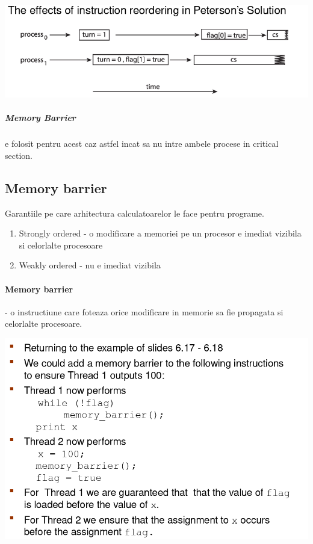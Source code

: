 \documentclass{article}
\begin{document}
\begin{center}
    \includegraphics[scale=0.4]{15_ptersonrevisited.png}
\end{center}
\subparagraph*{Memory Barrier} e folosit pentru acest caz astfel incat sa nu intre ambele procese in critical section.

\subsection*{Memory barrier}
Garantiile pe care arhitectura calculatoarelor le face pentru programe.
\begin{enumerate}
    \item Strongly ordered - o modificare a memoriei pe un procesor e imediat vizibila si celorlalte procesoare
    \item Weakly ordered - nu e imediat vizibila
\end{enumerate}
\paragraph*{Memory barrier} - o instructiune care foteaza orice modificare in memorie sa fie propagata si celorlalte procesoare.

\begin{center}
    \includegraphics[scale=0.3]{16_membarrier.png}
\end{center}
\end{document}
